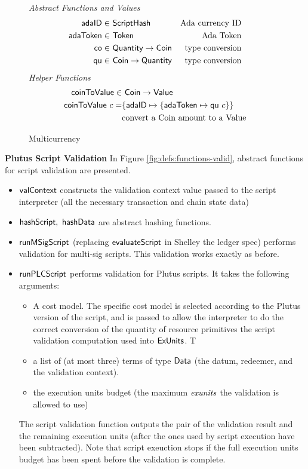 \begin{figure*}[htb]
  \emph{Abstract Functions and Values}
  \begin{align*}
    \mathsf{adaID} \in& ~\mathsf{ScriptHash}
    & \text{Ada currency ID} \\
    \mathsf{adaToken} \in& ~\mathsf{Token}
    & \text{Ada Token} \\
    \mathsf{co} \in& ~\mathsf{Quantity} \to \mathsf{Coin}
    & \text{type conversion} \\
    \mathsf{qu} \in& ~\mathsf{Coin} \to \mathsf{Quantity}
    & \text{type conversion} \\
  \end{align*}
  \emph{Helper Functions}
  \begin{align*}
    \mathsf{coinToValue} \in & ~\mathsf{Coin}\to \mathsf{Value} \\
    \mathsf{coinToValue}~ c = & \{\mathsf{adaID} \mapsto \{\mathsf{adaToken} \mapsto \mathsf{qu}~c\}\} \\
    &\text{convert a Coin amount to a Value} \\
  \end{align*}
  \caption{Multicurrency}
  \label{fig:defs:functions-helper}
\end{figure*}

\textbf{Plutus Script Validation}
In Figure \ref{fig:defs:functions-valid}, abstract functions for script validation
are presented.

\begin{itemize}
  \item $\mathsf{valContext}$ constructs the validation context value passed
  to the script interpreter (all the necessary transaction and chain state data)
  \item $\mathsf{hashScript},~ \mathsf{hashData}$ are abstract hashing functions.
  \item $\mathsf{runMSigScript}$ (replacing $\mathsf{evaluateScript}$ in Shelley the ledger spec) performs
  validation for multi-sig scripts.
  This validation works exactly as before.
  \item $\mathsf{runPLCScript}$ performs validation for Plutus scripts. It takes the following
  arguments:
  \begin{itemize}
  \item A cost model. The specific cost model is selected according to the Plutus
  version of the script, and is passed to allow the interpreter to do the
  correct conversion of the quantity of resource primitives the script validation
  computation used into $\mathsf{ExUnits}$. T
  \item
  a list of (at most three) terms of type $\mathsf{Data}$ (the datum, redeemer,
  and the validation context).
  \item the execution units budget (the maximum $\mathit{exunits}$
  the validation is allowed to use)
  \end{itemize}
  The script validation function outputs the pair of the validation result
  and the remaining execution units (after the ones used by script execution
  have been subtracted). Note that script exeuction stops if the full execution
  units budget has been spent before the validation is complete.
\end{itemize}

